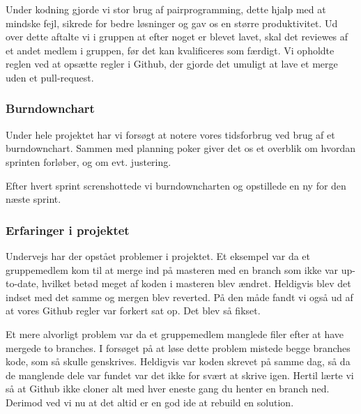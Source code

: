Under kodning gjorde vi stor brug af pairprogramming, dette hjalp med at mindske fejl, sikrede for bedre løsninger og gav os en større produktivitet.
Ud over dette aftalte vi i gruppen at efter noget er blevet lavet, 
skal det reviewes af et andet medlem i gruppen, før det kan kvalificeres som færdigt. Vi opholdte reglen ved at opsætte regler i Github, der gjorde det umuligt at lave et merge uden et pull-request.

\subsubsection{Burndownchart}

Under hele projektet har vi forsøgt at notere vores tidsforbrug ved brug af et burndownchart. Sammen med planning poker giver det os et overblik om hvordan sprinten forløber, og om evt. justering. 

Efter hvert sprint screnshottede vi burndowncharten og opstillede en ny for den næste sprint. 




\subsubsection{Erfaringer i projektet}

Undervejs har der opstået problemer i projektet. Et eksempel var da et gruppemedlem kom til at merge ind på masteren med en branch som ikke var up-to-date, hvilket betød meget af koden i masteren blev ændret. Heldigvis blev det indset med det samme og mergen blev reverted. På den måde fandt vi også ud af at vores Github regler var forkert sat op. Det blev så fikset.

Et mere alvorligt problem var da et gruppemedlem manglede filer efter at have mergede to branches. I forsøget på at løse dette problem mistede begge branches kode, som så skulle genskrives. Heldigvis var koden skrevet på samme dag, så da de manglende dele var fundet var det ikke for svært at skrive igen. Hertil lærte vi så at Github ikke cloner alt med hver eneste gang du henter en branch ned. Derimod ved vi nu at det altid er en god ide at rebuild en solution.